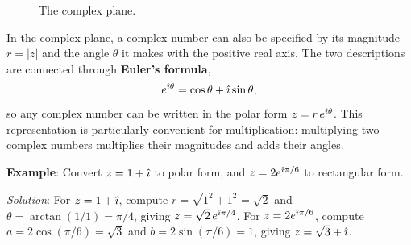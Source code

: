 \begin{figure}[H]
  \centering
  \caption{The complex plane.}
    \label{fig:complex-plane}
\end{figure}

In the complex plane, a complex number can also be specified by its magnitude $ r = |z| $ and the angle $ \theta $ it makes with the positive real axis.
The two descriptions are connected through \textbf{Euler's formula},
\begin{equation*}
    e^{\hat{\imath}\theta} = \cos\theta + \hat{\imath}\sin\theta,
\end{equation*}
so any complex number can be written in the polar form $ z = r\, e^{\hat{\imath}\theta} $.
This representation is particularly convenient for multiplication: multiplying two complex numbers multiplies their magnitudes and adds their angles.

\begin{exampleBox}
    \textbf{Example}: Convert $z = 1 + \hat{\imath}$ to polar form, and $z = 2 e^{\hat{\imath}\pi/6}$ to rectangular form.

    \emph{Solution}: For $z = 1 + \hat{\imath}$, compute $r = \sqrt{1^2 + 1^2} = \sqrt{2}$ and $\theta = \arctan(1/1) = \pi/4$, giving $z = \sqrt{2}\, e^{\hat{\imath}\pi/4}$. For $z = 2 e^{\hat{\imath}\pi/6}$, compute $a = 2\cos(\pi/6) = \sqrt{3}$ and $b = 2\sin(\pi/6) = 1$, giving $z = \sqrt{3} + \hat{\imath}$.
\end{exampleBox}


